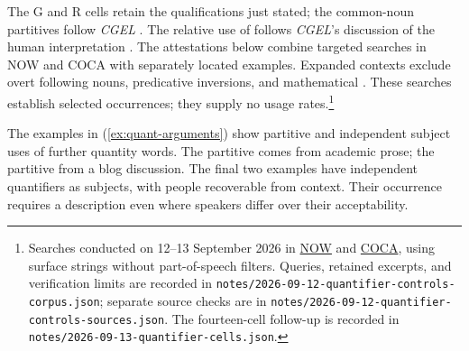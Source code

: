 \documentclass[12pt]{article}
\begin{document}
The G and R cells retain the qualifications just stated; the common-noun partitives follow \textit{CGEL} \citep[349--350]{huddleston2002}. The relative use of  follows \textit{CGEL}'s discussion of the human interpretation \citep[414]{huddleston2002}. The attestations below combine targeted searches in NOW and COCA with separately located examples. Expanded contexts exclude overt following nouns, predicative inversions, and mathematical . These searches establish selected occurrences; they supply no usage rates.\footnote{Searches conducted on 12--13 September 2026 in \href{https://www.english-corpora.org/now/}{NOW} and \href{https://www.english-corpora.org/coca/}{COCA}, using surface strings without part-of-speech filters. Queries, retained excerpts, and verification limits are recorded in \nolinkurl{notes/2026-09-12-quantifier-controls-corpus.json}; separate source checks are in \nolinkurl{notes/2026-09-12-quantifier-controls-sources.json}. The fourteen-cell follow-up is recorded in \nolinkurl{notes/2026-09-13-quantifier-cells.json}.}

The examples in (\ref{ex:quant-arguments}) show partitive and independent subject uses of further quantity words. The  partitive comes from academic prose; the  partitive from a blog discussion. The final two examples have independent quantifiers as subjects, with people recoverable from context. Their occurrence requires a description even where speakers differ over their acceptability.
\end{document}
